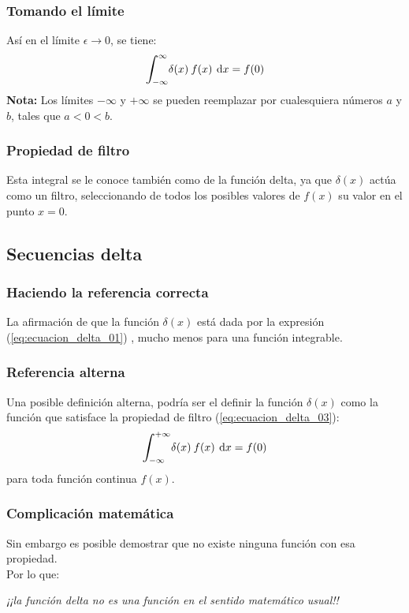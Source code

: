 \documentclass[12pt]{beamer}
\begin{document}
\begin{frame}
\frametitle{Tomando el límite}
Así en el límite $\epsilon \to 0$, se tiene:
\pause
\begin{align*}
\scaleint{6ex}_{\bs -\infty}^{\infty} \delta (x) \: f (x) \: \dd{x} = f (0)
\end{align*}
\textbf{Nota: } Los límites $-\infty$ y $+\infty$ se pueden reemplazar por cualesquiera números $a$ y $b$, tales que $a < 0 < b$.
\end{frame}

\begin{frame}
\frametitle{Propiedad de filtro}
Esta integral se le conoce también como  de la función delta, \pause ya que $\delta (x)$ actúa como un filtro, seleccionando de todos los posibles valores de $f (x)$ su valor en el punto $x = 0$.
\end{frame}

\subsection{Secuencias delta}\label{secuencias_delta}

\begin{frame}
\frametitle{Haciendo la referencia correcta}
La afirmación de que la función $\delta (x)$ está dada por la expresión (\ref{eq:ecuacion_delta_01}) \textit{}, mucho menos para una función integrable.
\end{frame}

\begin{frame}
\frametitle{Referencia alterna}
Una posible definición alterna, podría ser el definir la función $\delta (x)$ como la función que satisface la propiedad de filtro (\ref{eq:ecuacion_delta_03}):
\pause
\begin{align*}
\scaleint{6ex}_{\bs -\infty}^{+ \infty} \delta (x) \: f (x) \: \dd{x} = f (0)
\end{align*}
para toda función continua $f (x)$. 
\end{frame}

\begin{frame}
\frametitle{Complicación matemática}
Sin embargo es posible demostrar que no existe ninguna función con esa propiedad.
\\
\bigskip
\pause
Por lo que:
\pause
\begin{center}
\textit{¡¡la función delta no es una función en el sentido matemático usual!!}
\end{center}
\end{frame}
\end{document}
